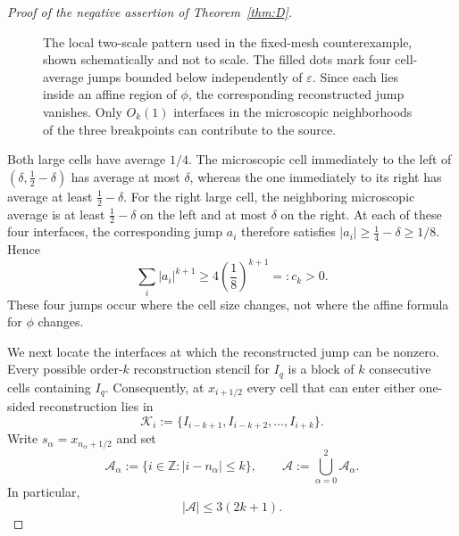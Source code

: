\documentclass[11pt]{amsart}
\theoremstyle{plain}
\theoremstyle{definition}
\theoremstyle{remark}
\numberwithin{equation}{section}
\theoremstyle{plain}
\begin{document}
\begin{proof}[Proof of the negative assertion of
	Theorem~\ref{thm:D}]
\begin{figure}[htbp]
{%
		}
		\caption{The local two-scale pattern used in the fixed-mesh
			counterexample, shown schematically and not to scale.
			The filled dots mark four cell-average jumps bounded below
			independently of \(\varepsilon\).  Since each lies inside an affine region of \(\phi\), the
			corresponding reconstructed jump vanishes.  Only \(O_k(1)\) interfaces in the
			microscopic neighborhoods of the three breakpoints can contribute to the
			source.}
		\label{fig:nonuniform-tent-mesh}
	\end{figure}
	
	Both large cells have average $1/4$.  The microscopic cell immediately to
	the left of $(\delta,\frac12-\delta)$ has average at most $\delta$, whereas
	the one immediately to its right has average at least
	$\frac12-\delta$.  For the right large cell, the neighboring microscopic
	average is at least $\frac12-\delta$ on the left and at most $\delta$ on the
	right.  At each of these four interfaces, the corresponding jump
	$a_i$ therefore satisfies $|a_i|\ge\frac14-\delta\ge1/8$.  Hence
	\begin{equation}\label{eq:tent-jump-lower-bound}
		\sum_i|a_i|^{k+1}
		\ge4\left(\frac18\right)^{k+1}
		=:c_k>0.
	\end{equation}
	These four jumps occur where the cell size changes, not where the affine
	formula for $\phi$ changes.
	
	We next locate the interfaces at which the reconstructed jump can be
	nonzero.  Every possible order-$k$ reconstruction stencil for $I_q$ is a
	block of $k$ consecutive cells containing $I_q$.  Consequently, at
	$x_{i+1/2}$ every cell that can enter either one-sided reconstruction lies
	in
	\begin{equation}\label{eq:possible-stencil-hull}
		\mathcal K_i
		:=
		\{I_{i-k+1},I_{i-k+2},\ldots,I_{i+k}\}.
	\end{equation}
	Write $s_\alpha=x_{n_\alpha+1/2}$ and set
	\begin{equation}\label{eq:exceptional-interface-set}
		\mathcal A_\alpha
		:=
		\{i\in\mathbb Z:|i-n_\alpha|\le k\},
		\qquad
		\mathcal A
		:=
		\bigcup_{\alpha=0}^{2}\mathcal A_\alpha.
	\end{equation}
	In particular,
	\begin{equation}\label{eq:exceptional-set-cardinality}
		|\mathcal A|\le3(2k+1).
	\end{equation}
	

\end{proof}
\end{document}
